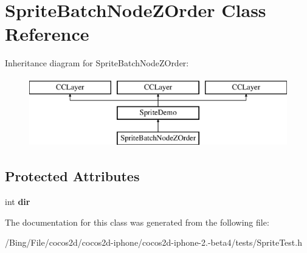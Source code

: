 \hypertarget{interface_sprite_batch_node_z_order}{\section{Sprite\-Batch\-Node\-Z\-Order Class Reference}
\label{interface_sprite_batch_node_z_order}
}
Inheritance diagram for Sprite\-Batch\-Node\-Z\-Order\-:\begin{figure}[H]
\begin{center}
\leavevmode
\includegraphics[height=3.000000cm]{interface_sprite_batch_node_z_order}
\end{center}
\end{figure}
\subsection*{Protected Attributes}
\begin{DoxyCompactItemize}
\item 
\hypertarget{interface_sprite_batch_node_z_order_a72b11b2d18c006ef1accd7ff5f8c5ae6}{int {\bfseries dir}}\label{interface_sprite_batch_node_z_order_a72b11b2d18c006ef1accd7ff5f8c5ae6}

\end{DoxyCompactItemize}


The documentation for this class was generated from the following file\-:\begin{DoxyCompactItemize}
\item 
/\-Bing/\-File/cocos2d/cocos2d-\/iphone/cocos2d-\/iphone-\/2.-\/beta4/tests/Sprite\-Test.\-h\end{DoxyCompactItemize}
